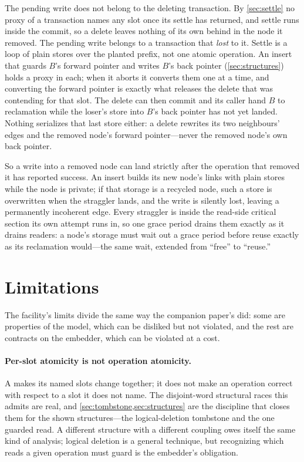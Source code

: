 \documentclass[11pt]{article}
\begin{document}
The pending write does not belong to the deleting transaction. By
\cref{sec:settle} no proxy of a transaction names any slot once its settle has
returned, and settle runs inside the commit, so a delete leaves nothing of its
own behind in the node it removed. The pending write belongs to a transaction
that \emph{lost} to it. Settle is a loop of plain stores over the planted
prefix, not one atomic operation. An insert that guards $B$'s forward pointer and
writes $B$'s back pointer (\cref{sec:structures}) holds a proxy in each; when it
aborts it converts them one at a time, and converting the forward pointer is
exactly what releases the delete that was contending for that slot. The delete
can then commit and its caller hand $B$ to reclamation while the loser's store
into $B$'s back pointer has not yet landed. Nothing serializes that last store
either: a delete rewrites its two neighbours' edges and the removed node's
forward pointer---never the removed node's own back pointer.

So a write into a removed node can land strictly after the operation that
removed it has reported success. An insert builds its new node's links with
plain stores while the node is private; if that storage is a recycled node, such
a store is overwritten when the straggler lands, and the write is silently lost,
leaving a permanently incoherent edge. Every straggler is inside the read-side
critical section its own attempt runs in, so one grace period drains them
exactly as it drains readers: a node's storage must wait out a grace period
before reuse exactly as its reclamation would---the same wait, extended from
``free'' to ``reuse.''

\section{Limitations}
\label{sec:limitations}

The facility's limits divide the same way the companion paper's did: some are
properties of the model, which can be disliked but not violated, and the rest are
contracts on the embedder, which can be violated at a cost.

\paragraph{Per-slot atomicity is not operation atomicity.} A \kcas makes its
named slots change together; it does not make an operation correct with respect
to a slot it does not name. The disjoint-word structural races this admits are
real, and \cref{sec:tombstone,sec:structures} are the discipline that closes them
for the shown structures---the logical-deletion tombstone and the one guarded
read. A different structure with a different coupling owes itself the same kind of
analysis; logical deletion is a general technique, but recognizing which reads a
given operation must guard is the embedder's obligation.
\end{document}
